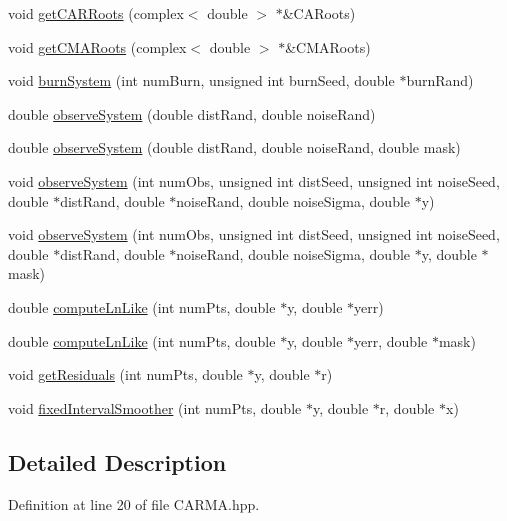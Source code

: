 \begin{DoxyCompactItemize}
void \hyperlink{class_c_a_r_m_a_a98f282f6809e1e2c19ed10b362048fdc}{get\-C\-A\-R\-Roots} (complex$<$ double $>$ $\ast$\&C\-A\-Roots)
\item 
void \hyperlink{class_c_a_r_m_a_aead4fd2cb0a4f1670e866435a09e0d50}{get\-C\-M\-A\-Roots} (complex$<$ double $>$ $\ast$\&C\-M\-A\-Roots)
\item 
void \hyperlink{class_c_a_r_m_a_a684661827088a58ccc3131184e7506ba}{burn\-System} (int num\-Burn, unsigned int burn\-Seed, double $\ast$burn\-Rand)
\item 
double \hyperlink{class_c_a_r_m_a_a12f0019ddf951e20ffda09e46795b8f3}{observe\-System} (double dist\-Rand, double noise\-Rand)
\item 
double \hyperlink{class_c_a_r_m_a_adbfdf1b311724e3a128613d880db66c5}{observe\-System} (double dist\-Rand, double noise\-Rand, double mask)
\item 
void \hyperlink{class_c_a_r_m_a_ad920bb6c62ce79b2ad5871bfcfe515de}{observe\-System} (int num\-Obs, unsigned int dist\-Seed, unsigned int noise\-Seed, double $\ast$dist\-Rand, double $\ast$noise\-Rand, double noise\-Sigma, double $\ast$y)
\item 
void \hyperlink{class_c_a_r_m_a_a083e1356ab030a2279a882b71eee26c1}{observe\-System} (int num\-Obs, unsigned int dist\-Seed, unsigned int noise\-Seed, double $\ast$dist\-Rand, double $\ast$noise\-Rand, double noise\-Sigma, double $\ast$y, double $\ast$mask)
\item 
double \hyperlink{class_c_a_r_m_a_acd0e0de5df0e6f26b87df72d0d5988e9}{compute\-Ln\-Like} (int num\-Pts, double $\ast$y, double $\ast$yerr)
\item 
double \hyperlink{class_c_a_r_m_a_aec17c78b88d909dba10342447915a89e}{compute\-Ln\-Like} (int num\-Pts, double $\ast$y, double $\ast$yerr, double $\ast$mask)
\item 
void \hyperlink{class_c_a_r_m_a_a2d84c0d953b15519cbddcfffc50132b0}{get\-Residuals} (int num\-Pts, double $\ast$y, double $\ast$r)
\item 
void \hyperlink{class_c_a_r_m_a_af5d31db7b37973d2dea0dae07ef531b5}{fixed\-Interval\-Smoother} (int num\-Pts, double $\ast$y, double $\ast$r, double $\ast$x)
\end{DoxyCompactItemize}


\subsection{Detailed Description}


Definition at line 20 of file C\-A\-R\-M\-A.\-hpp.



